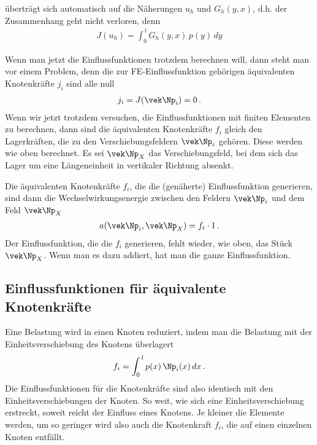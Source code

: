\"{u}bertr\"{a}gt sich automatisch auf die N\"{a}herungen $u_h$ und $G_h(y,x)$, d.h. der Zusammenhang geht nicht verloren, denn
\begin{align}
J(u_h) = \int_0^{\,l} G_h(y,x)\,p(y)\,dy
\end{align}

Wenn man jetzt die Einflussfunktionen trotzdem berechnen will, dann steht man vor einem Problem, denn die zur FE-Einflussfunktion geh\"{o}rigen \"{a}quivalenten Knotenkr\"{a}fte $j_i $ sind alle null
\begin{align}
j_i = J(\vek \Np_i) = 0\,.
\end{align}
Wenn wir jetzt trotzdem versuchen, die Einflussfunktionen mit finiten Elementen zu berechnen, dann sind die \"{a}quivalenten Knotenkr\"{a}fte $f_i$ gleich den Lagerkr\"{a}ften, die zu den Verschiebungsfeldern
$\vek \Np_i$ geh\"{o}ren. Diese werden wie oben berechnet. Es sei $\vek \Np_X$ das Verschiebungsfeld, bei dem sich das Lager um eine L\"{a}ngeneinheit in vertikaler Richtung absenkt.

Die \"{a}quivalenten Knotenkr\"{a}fte $f_i$, die die (gen\"{a}herte) Einflussfunktion generieren, sind dann die Wechselwirkungsenergie zwischen den Feldern $\vek \Np_i$ und dem Feld $\vek \Np_X$
\begin{align}
a(\vek \Np_i,\vek \Np_X) = f_i \cdot 1\,.
\end{align}
Der Einflussfunktion, die die $f_i$ generieren, fehlt wieder, wie oben, das St\"{u}ck $\vek \Np_X$. Wenn man es dazu addiert, hat man die ganze Einflussfunktion.\\



{\textcolor{blau2}{\section{Einflussfunktionen f\"{u}r \"{a}quivalente Knotenkr\"{a}fte}}}
Eine Belastung wird in einen Knoten reduziert, indem man die Belastung mit der Einheitsverschiebung des Knotens \"{u}berlagert
\begin{align}
f_i = \int_0^{\,l} p(x)\,\Np_i(x)\,dx\,.
\end{align}
Die Einflussfunktionen f\"{u}r die Knotenkr\"{a}fte sind also identisch mit den Einheitsverschiebungen der Knoten. So weit, wie sich eine Einheitsverschiebung erstreckt, soweit reicht der Einfluss eines Knotens. Je kleiner die Elemente werden, um so geringer wird also auch die Knotenkraft $f_i $, die auf einen einzelnen Knoten entf\"{a}llt.

